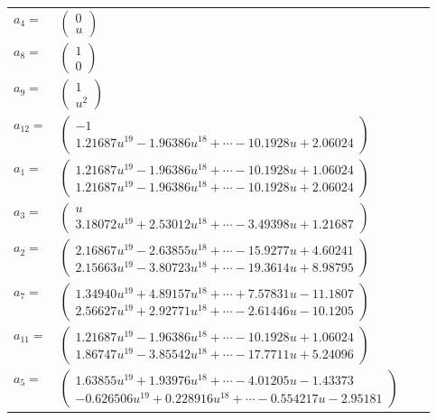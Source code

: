 \documentclass[1p]{elsarticle_modified}
\theoremstyle{definition}
\begin{document}
\begin{tabular}{m{7pt} m{180pt} m{7pt} m{180pt} }
\flushright $a_{4}=$&$\begin{pmatrix}0\\u\end{pmatrix}$ \\
\flushright $a_{8}=$&$\begin{pmatrix}1\\0\end{pmatrix}$ \\
\flushright $a_{9}=$&$\begin{pmatrix}1\\u^2\end{pmatrix}$ \\
\flushright $a_{12}=$&$\begin{pmatrix}-1\\1.21687 u^{19}-1.96386 u^{18}+\cdots-10.1928 u+2.06024\end{pmatrix}$ \\
\flushright $a_{1}=$&$\begin{pmatrix}1.21687 u^{19}-1.96386 u^{18}+\cdots-10.1928 u+1.06024\\1.21687 u^{19}-1.96386 u^{18}+\cdots-10.1928 u+2.06024\end{pmatrix}$ \\
\flushright $a_{3}=$&$\begin{pmatrix}u\\3.18072 u^{19}+2.53012 u^{18}+\cdots-3.49398 u+1.21687\end{pmatrix}$ \\
\flushright $a_{2}=$&$\begin{pmatrix}2.16867 u^{19}-2.63855 u^{18}+\cdots-15.9277 u+4.60241\\2.15663 u^{19}-3.80723 u^{18}+\cdots-19.3614 u+8.98795\end{pmatrix}$ \\
\flushright $a_{7}=$&$\begin{pmatrix}1.34940 u^{19}+4.89157 u^{18}+\cdots+7.57831 u-11.1807\\2.56627 u^{19}+2.92771 u^{18}+\cdots-2.61446 u-10.1205\end{pmatrix}$ \\
\flushright $a_{11}=$&$\begin{pmatrix}1.21687 u^{19}-1.96386 u^{18}+\cdots-10.1928 u+1.06024\\1.86747 u^{19}-3.85542 u^{18}+\cdots-17.7711 u+5.24096\end{pmatrix}$ \\
\flushright $a_{5}=$&$\begin{pmatrix}1.63855 u^{19}+1.93976 u^{18}+\cdots-4.01205 u-1.43373\\-0.626506 u^{19}+0.228916 u^{18}+\cdots-0.554217 u-2.95181\end{pmatrix}$ \\

\end{tabular}
\end{document}
